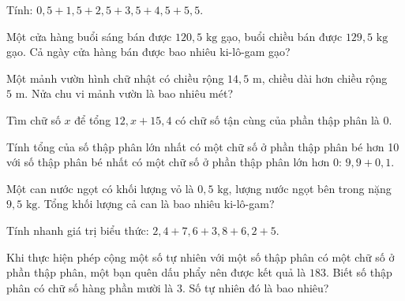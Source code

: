 \begin{ex}
  Tính: $0{,}5 + 1{,}5 + 2{,}5 + 3{,}5 + 4{,}5 + 5{,}5$.
\end{ex}

\begin{ex}
  Một cửa hàng buổi sáng bán được $120{,}5\text{ kg}$ gạo, buổi chiều bán được $129{,}5\text{ kg}$ gạo. Cả ngày cửa hàng bán được bao nhiêu ki-lô-gam gạo?
\end{ex}

\begin{ex}
  Một mảnh vườn hình chữ nhật có chiều rộng $14{,}5\text{ m}$, chiều dài hơn chiều rộng $5\text{ m}$. Nửa chu vi mảnh vườn là bao nhiêu mét?
\end{ex}

\begin{ex}
  Tìm chữ số $x$ để tổng $12{,}x + 15{,}4$ có chữ số tận cùng của phần thập phân là 0.
\end{ex}

\begin{ex}
  Tính tổng của số thập phân lớn nhất có một chữ số ở phần thập phân bé hơn 10 với số thập phân bé nhất có một chữ số ở phần thập phân lớn hơn 0: $9{,}9 + 0{,}1$.
\end{ex}

\begin{ex}
  Một can nước ngọt có khối lượng vỏ là $0{,}5\text{ kg}$, lượng nước ngọt bên trong nặng $9{,}5\text{ kg}$. Tổng khối lượng cả can là bao nhiêu ki-lô-gam?
\end{ex}

\begin{ex}
  Tính nhanh giá trị biểu thức: $2{,}4 + 7{,}6 + 3{,}8 + 6{,}2 + 5$.
\end{ex}

\begin{ex}
  Khi thực hiện phép cộng một số tự nhiên với một số thập phân có một chữ số ở phần thập phân, một bạn quên dấu phẩy nên được kết quả là $183$. Biết số thập phân có chữ số hàng phần mười là $3$. Số tự nhiên đó là bao nhiêu?
\end{ex}
